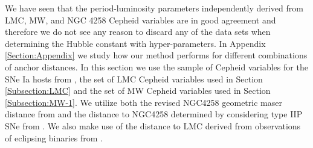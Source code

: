 We have seen that the period-luminosity parameters independently derived from LMC, MW, and NGC 4258 Cepheid variables are in good agreement and therefore we do not see any reason to discard any of the data sets when determining the Hubble constant with hyper-parameters. In Appendix \ref{Section:Appendix} we study how our method performs for different combinations of anchor distances. In this section we use the sample of Cepheid variables for the SNe Ia hosts from \cite{Riess:2011yx}, the set of LMC Cepheid variables used in Section \ref{Subsection:LMC} and the set of MW Cepheid variables used in Section \ref{Subsection:MW-1}. We utilize both the revised NGC4258 geometric maser distance from \cite{Humphreys:2013eja} and the distance to NGC4258 determined by considering type IIP SNe from \cite{Polshaw:2015ika}. We also make use of the distance to LMC derived from observations of eclipsing binaries from \cite{Pietrzynski:2013gia}.

